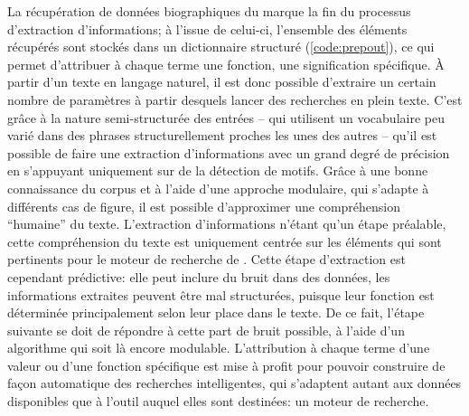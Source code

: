 La récupération de données biographiques du \ttrait{} marque la fin du processus d'extraction d'informations; à l'issue de celui-ci, l'ensemble des éléments récupérés sont stockés dans un \gls{dictionnaire} structuré (\ref{code:prepout}), ce qui permet d'attribuer à chaque terme une fonction, une signification spécifique. À partir d'un texte en langage naturel, il est donc possible d'extraire un certain nombre de paramètres à partir desquels lancer des recherches en plein texte. C'est grâce à la nature semi-structurée des entrées -- qui utilisent un vocabulaire peu varié dans des phrases structurellement proches les unes des autres -- qu'il est possible de faire une extraction d'informations avec un grand degré de précision en s'appuyant uniquement sur de la détection de motifs. Grâce à une bonne connaissance du corpus et à l'aide d'une approche modulaire, qui s'adapte à différents cas de figure, il est possible d'approximer une compréhension \enquote{humaine} du texte. L'extraction d'informations n'étant qu'un étape préalable, cette compréhension du texte est uniquement centrée sur les éléments qui sont pertinents pour le moteur de recherche de \wkd{}. Cette étape d'extraction est cependant prédictive: elle peut inclure du bruit dans des données, les informations extraites peuvent être mal structurées, puisque leur fonction est déterminée principalement selon leur place dans le texte. De ce fait, l'étape suivante se doit de répondre à cette part de bruit possible, à l'aide d'un algorithme qui soit là encore modulable. L'attribution à chaque terme d'une valeur ou d'une fonction spécifique est mise à profit pour pouvoir construire de façon automatique des recherches intelligentes, qui s'adaptent autant aux données disponibles que à l'outil auquel elles sont destinées: un moteur de recherche.


